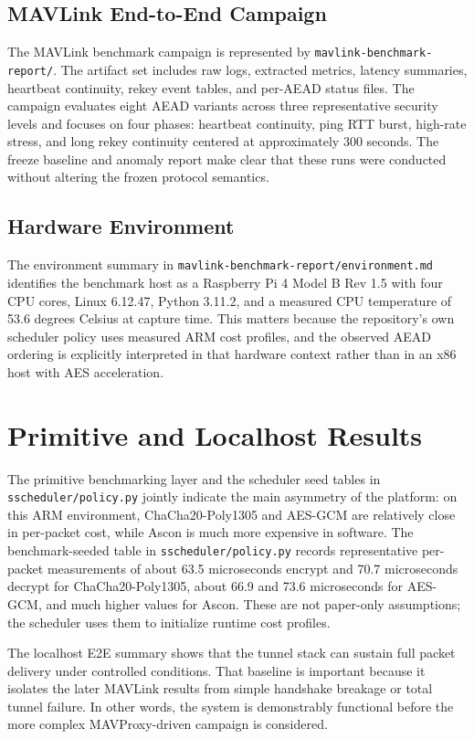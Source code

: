 \documentclass[11pt]{article}
\begin{document}
\subsection{MAVLink End-to-End Campaign}
The MAVLink benchmark campaign is represented by \texttt{mavlink-benchmark-report/}. The artifact set includes raw logs, extracted metrics, latency summaries, heartbeat continuity, rekey event tables, and per-AEAD status files. The campaign evaluates eight AEAD variants across three representative security levels and focuses on four phases: heartbeat continuity, ping RTT burst, high-rate stress, and long rekey continuity centered at approximately 300 seconds. The freeze baseline and anomaly report make clear that these runs were conducted without altering the frozen protocol semantics.

\subsection{Hardware Environment}
The environment summary in \texttt{mavlink-benchmark-report/environment.md} identifies the benchmark host as a Raspberry Pi 4 Model B Rev 1.5 with four CPU cores, Linux 6.12.47, Python 3.11.2, and a measured CPU temperature of 53.6 degrees Celsius at capture time. This matters because the repository's own scheduler policy uses measured ARM cost profiles, and the observed AEAD ordering is explicitly interpreted in that hardware context rather than in an x86 host with AES acceleration.

\section{Primitive and Localhost Results}
The primitive benchmarking layer and the scheduler seed tables in \texttt{sscheduler/policy.py} jointly indicate the main asymmetry of the platform: on this ARM environment, ChaCha20-Poly1305 and AES-GCM are relatively close in per-packet cost, while Ascon is much more expensive in software. The benchmark-seeded table in \texttt{sscheduler/policy.py} records representative per-packet measurements of about 63.5 microseconds encrypt and 70.7 microseconds decrypt for ChaCha20-Poly1305, about 66.9 and 73.6 microseconds for AES-GCM, and much higher values for Ascon. These are not paper-only assumptions; the scheduler uses them to initialize runtime cost profiles.

The localhost E2E summary shows that the tunnel stack can sustain full packet delivery under controlled conditions. That baseline is important because it isolates the later MAVLink results from simple handshake breakage or total tunnel failure. In other words, the system is demonstrably functional before the more complex MAVProxy-driven campaign is considered.
\end{document}
